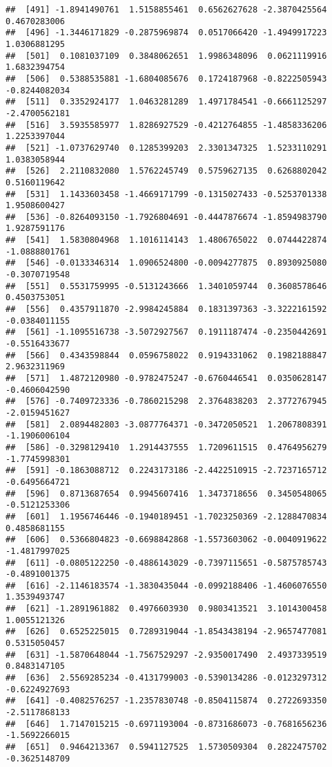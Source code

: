 \documentclass[
]{article}
\begin{document}
\begin{verbatim}
##  [491] -1.8941490761  1.5158855461  0.6562627628 -2.3870425564  0.4670283006
##  [496] -1.3446171829 -0.2875969874  0.0517066420 -1.4949917223  1.0306881295
##  [501]  0.1081037109  0.3848062651  1.9986348096  0.0621119916  1.6832394754
##  [506]  0.5388535881 -1.6804085676  0.1724187968 -0.8222505943 -0.8244082034
##  [511]  0.3352924177  1.0463281289  1.4971784541 -0.6661125297 -2.4700562181
##  [516]  3.5935585977  1.8286927529 -0.4212764855 -1.4858336206  1.2253397044
##  [521] -1.0737629740  0.1285399203  2.3301347325  1.5233110291  1.0383058944
##  [526]  2.2110832080  1.5762245749  0.5759627135  0.6268802042  0.5160119642
##  [531]  1.1433603458 -1.4669171799 -0.1315027433 -0.5253701338  1.9508600427
##  [536] -0.8264093150 -1.7926804691 -0.4447876674 -1.8594983790  1.9287591176
##  [541]  1.5830804968  1.1016114143  1.4806765022  0.0744422874 -1.0888801761
##  [546] -0.0133346314  1.0906524800 -0.0094277875  0.8930925080 -0.3070719548
##  [551]  0.5531759995 -0.5131243666  1.3401059744  0.3608578646  0.4503753051
##  [556]  0.4357911870 -2.9984245884  0.1831397363 -3.3222161592 -0.0384011155
##  [561] -1.1095516738 -3.5072927567  0.1911187474 -0.2350442691 -0.5516433677
##  [566]  0.4343598844  0.0596758022  0.9194331062  0.1982188847  2.9632311969
##  [571]  1.4872120980 -0.9782475247 -0.6760446541  0.0350628147 -0.4606042590
##  [576] -0.7409723336 -0.7860215298  2.3764838203  2.3772767945 -2.0159451627
##  [581]  2.0894482803 -3.0877764371 -0.3472050521  1.2067808391 -1.1906006104
##  [586] -0.3298129410  1.2914437555  1.7209611515  0.4764956279 -1.7745998301
##  [591] -0.1863088712  0.2243173186 -2.4422510915 -2.7237165712 -0.6495664721
##  [596]  0.8713687654  0.9945607416  1.3473718656  0.3450548065 -0.5121253306
##  [601]  1.1956746446 -0.1940189451 -1.7023250369 -2.1288470834  0.4858681155
##  [606]  0.5366804823 -0.6698842868 -1.5573603062 -0.0040919622 -1.4817997025
##  [611] -0.0805122250 -0.4886143029 -0.7397115651 -0.5875785743 -0.4891001375
##  [616] -2.1146183574 -1.3830435044 -0.0992188406 -1.4606076550  1.3539493747
##  [621] -1.2891961882  0.4976603930  0.9803413521  3.1014300458  1.0055121326
##  [626]  0.6525225015  0.7289319044 -1.8543438194 -2.9657477081  0.5315050457
##  [631] -1.5870648044 -1.7567529297 -2.9350017490  2.4937339519  0.8483147105
##  [636]  2.5569285234 -0.4131799003 -0.5390134286 -0.0123297312 -0.6224927693
##  [641] -0.4082576257 -1.2357830748 -0.8504115874  0.2722693350 -2.5117868133
##  [646]  1.7147015215 -0.6971193004 -0.8731686073 -0.7681656236 -1.5692266015
##  [651]  0.9464213367  0.5941127525  1.5730509304  0.2822475702 -0.3625148709

\end{verbatim}
\end{document}
